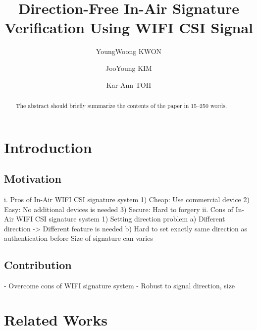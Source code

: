 \documentclass[runningheads]{llncs}
\begin{document}
%
\title{Direction-Free In-Air Signature Verification Using WIFI CSI Signal}
%
%
\author{YoungWoong KWON \and
JooYoung KIM \and
Kar-Ann TOH}
%
%
%
\maketitle              %
%
\begin{abstract}
The abstract should briefly summarize the contents of the paper in
15--250 words.

\end{abstract}
%
%
%
\section{Introduction}

\subsection{Motivation}
i. Pros of In-Air WIFI CSI signature system
1) Cheap: Use commercial device
2) Easy: No additional devices is needed
3) Secure: Hard to forgery
ii. Cons of In-Air WIFI CSI signature system
1) Setting direction problem
a) Different direction -> Different feature is needed
b) Hard to set exactly same direction as authentication before
Size of signature can varies

\subsection{Contribution}
- Overcome cons of WIFI signature system
- Robust to signal direction, size

\section{Related Works}
\end{document}
